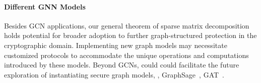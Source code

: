 \paragraph{Different GNN Models}
Besides GCN applications, our general theorem of sparse matrix decomposition 
holds potential for broader adoption to further graph-structured protection in the cryptographic domain.
Implementing new graph models may necessitate customized protocols to accommodate the unique operations and computations introduced by these models.
Beyond GCNs, \cgnn could could facilitate the future exploration of instantiating secure graph models, \eg, GraphSage~\cite{nips/HamiltonYL17}, GAT~\cite{iclr/VelickovicCCRLB18}.